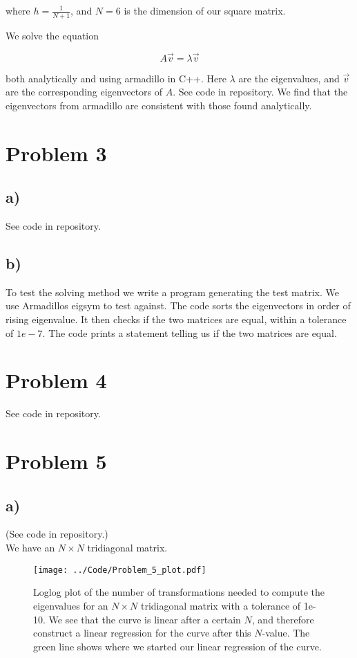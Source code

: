 \documentclass[english,notitlepage]{article}  %
\begin{document}
where $h = \frac{1}{N+1}$, and $N = 6$ is the dimension of our square matrix.

We solve the equation

\begin{equation*}
    A \vec{v} = \lambda \vec{v}
\end{equation*}

both analytically and using armadillo in C++. Here $\lambda$ are the
eigenvalues, and $\vec{v}$ are the corresponding eigenvectors of $A$. See code
in repository. We find that the eigenvectors from armadillo are consistent with
those found analytically.


\section*{Problem 3}
\subsection*{a)}
See code in repository.

\subsection*{b)}
To test the solving method we write a program generating the test matrix. We use
Armadillos eigsym to test against. The code sorts the eigenvectors in order of
rising eigenvalue. It then checks if the two matrices are equal, within a tolerance
of $1e-7$. The code prints a statement telling us if the two matrices are equal.

\section*{Problem 4}

See code in repository.


\section*{Problem 5}
\subsection*{a)}
(See code in repository.)\\
We have an $N \times N$ tridiagonal matrix. 

\begin{figure}[H]
    \centering
    \texttt{[image: ../Code/Problem\_5\_plot.pdf]}
    \caption{Loglog plot of the number of transformations needed to compute the eigenvalues for an $N \times N$ tridiagonal matrix with a tolerance of 1e-10. We see that the curve is linear after a certain $N$, and therefore construct a linear regression for the curve after this $N$-value. The green line shows where we started our linear regression of the curve.}
    \label{fig:5plot}
\end{figure}
\end{document}
